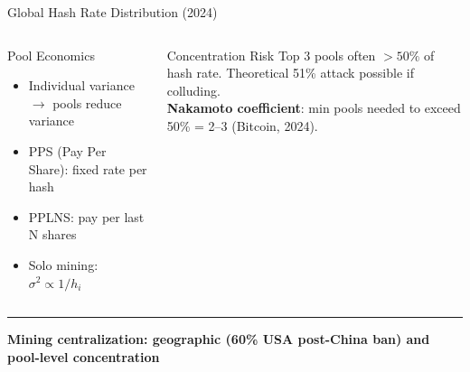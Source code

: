 \documentclass[8pt,aspectratio=169]{beamer}
\newcommand{\bottomnote}[1]{\vfill\vspace{-2mm}\textcolor{mllavender2}{\rule{\textwidth}{0.4pt}}\vspace{1mm}\footnotesize\textbf{#1}}
\begin{document}
\begin{frame}{Global Hash Rate Distribution (2024)}
\begin{columns}
\begin{block}{Pool Economics}
\begin{itemize}\small
  \item Individual variance $\to$ pools reduce variance
  \item PPS (Pay Per Share): fixed rate per hash
  \item PPLNS: pay per last N shares
  \item Solo mining: $\sigma^2 \propto 1/h_i$
\end{itemize}
\end{block}
\vspace{2mm}
\begin{block}{Concentration Risk}
Top 3 pools often $>50\%$ of hash rate. Theoretical 51\% attack possible if colluding.\\[4pt]
\textbf{Nakamoto coefficient}: min pools needed to exceed 50\% = 2--3 (Bitcoin, 2024).
\end{block}
\end{columns}
\bottomnote{Mining centralization: geographic (60\% USA post-China ban) and pool-level concentration}
\end{frame}
\end{document}
